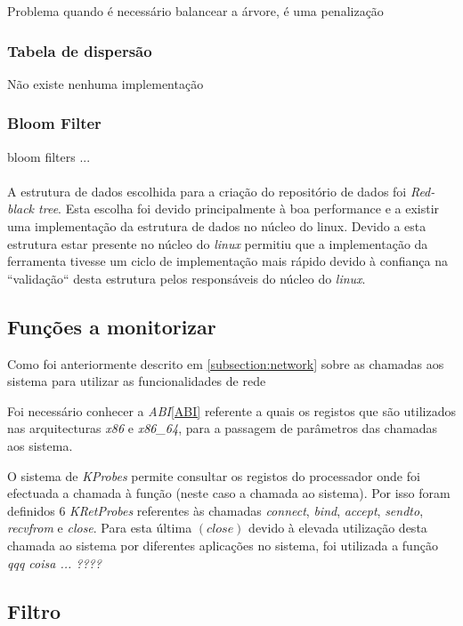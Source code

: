Problema quando é necessário balancear a árvore, é uma penalização

\subsubsection{Tabela de dispersão}
Não existe nenhuma implementação 

\subsubsection{Bloom Filter}
bloom filters ...

\paragraph*{}
A estrutura de dados escolhida para a criação do repositório de dados foi
\textit{Red-black tree}. Esta escolha foi devido principalmente à boa
performance e a existir uma implementação da estrutura de dados no núcleo do
linux. Devido a esta estrutura estar presente no núcleo do \textit{linux}
permitiu que a implementação da ferramenta tivesse um ciclo de implementação
mais rápido devido à confiança na ``validação`` desta estrutura pelos
responsáveis do núcleo do \textit{linux}.

\subsection{Funções a monitorizar}

Como foi anteriormente descrito em \ref{subsection:network} sobre as chamadas
aos sistema para utilizar as funcionalidades de rede

Foi necessário conhecer a \textit{ABI}\ref{ABI}\cite{ABI} referente a quais os
registos que são utilizados nas arquitecturas \textit{x86} e \textit{x86\_64},
para a passagem de parâmetros das chamadas aos sistema.

O sistema de \textit{KProbes} permite consultar os registos do processador onde
foi efectuada a chamada à função (neste caso a chamada ao sistema). Por isso
foram definidos 6 \textit{KRetProbes} referentes às chamadas \textit{connect},
\textit{bind}, \textit{accept}, \textit{sendto}, \textit{recvfrom} e
\textit{close}. Para esta última $\left( \textit{close} \right)$ devido à
elevada utilização desta chamada ao sistema por diferentes aplicações no
sistema, foi utilizada a função \textit{qqq coisa ...  ????}

\subsection{Filtro}

